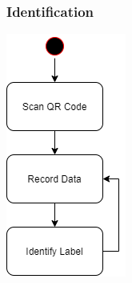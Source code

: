 \subsubsection{Identification}
\begin{center}
    \includegraphics[width=\textwidth,height=0.8\textheight,keepaspectratio]{charts/flow3.png}
\end{center}